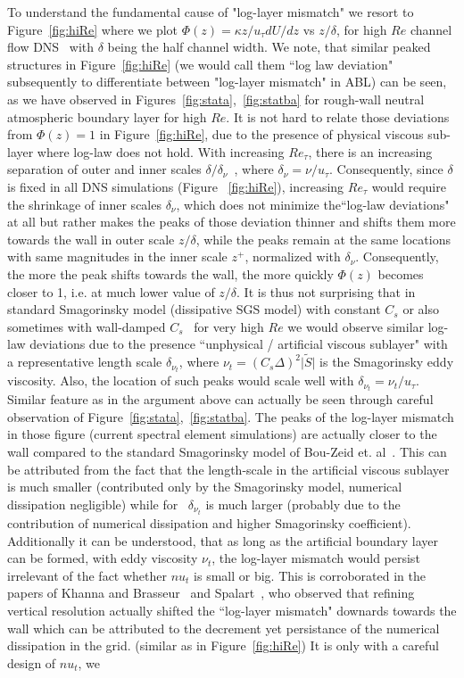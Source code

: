 To understand the fundamental cause of "log-layer mismatch" we resort to Figure~\ref{fig:hiRe} where we plot $\Phi(z) = \kappa z/u_{\tau} dU/dz$ vs $z/\delta$, for high $Re$ channel flow DNS~\cite{lee2} with $\delta$ being the half channel width. We note, that  similar peaked structures in Figure~\ref{fig:hiRe} (we would call them ``log law deviation" subsequently to differentiate between "log-layer mismatch" in ABL) can be seen, as we have  observed in Figures~\ref{fig:stata},~\ref{fig:statba} for rough-wall neutral atmospheric boundary layer for high $Re$. It is not hard to relate those deviations from $\Phi(z) = 1$ in Figure~\ref{fig:hiRe}, due to the presence of physical viscous sub-layer where log-law does not hold. With increasing $Re_{\tau}$, there is an increasing separation of outer and inner scales $\delta/\delta_{\nu}$~\cite{pope,balad}, where $\delta_{\nu} = \nu/u_{\tau}$. Consequently, since $\delta$ is fixed in all DNS simulations (Figure ~\ref{fig:hiRe}), increasing $Re_{\tau}$ would require the shrinkage of inner scales $\delta_{\nu}$, which does not minimize the``log-law deviations" at all but rather makes the peaks of those deviation thinner and  shifts them more towards the wall in outer scale $z/\delta$, while the peaks remain at the same locations with same magnitudes in the inner scale $z^{+}$, normalized with $\delta_{\nu}$. Consequently, the more the peak shifts towards the wall, the more quickly $\Phi(z)$ becomes closer to 1, i.e. at much lower value of $z/\delta$.  It is thus not surprising that in standard Smagorinsky model (dissipative SGS model) with constant $C_s$ or also sometimes with wall-damped $C_s$~\cite{mason,chow} for very high $Re$ we would observe similar log-law deviations due to the presence ``unphysical / artificial viscous sublayer" with a representative length scale $\delta_{\nu_t}$, where $\nu_{t} = (C_s\Delta)^{2}\vert \widetilde{S} \vert$ is the Smagorinsky eddy viscosity. Also, the location of such peaks would scale well with $\delta_{\nu_{t}} = \nu_{t}/u_{\tau}$. Similar feature as in the argument above can actually be seen through careful observation of Figure~\ref{fig:stata},~\ref{fig:statba}. The peaks of the log-layer mismatch in those figure (current spectral element simulations) are actually closer to the wall compared to the standard Smagorinsky model of Bou-Zeid et. al~\cite{bou1}. This can be attributed from the fact that the length-scale in the artificial viscous sublayer is much smaller (contributed only by the Smagorinsky model, numerical dissipation negligible) while for~\cite{bou1} $\delta_{\nu_t}$ is much larger (probably due to the contribution of numerical dissipation and higher Smagorinsky coefficient). Additionally it can be understood, that as long as the artificial boundary layer can be formed, with eddy viscosity $\nu_t$, the log-layer mismatch would persist irrelevant of the fact whether $nu_{t}$ is small or big. This is corroborated in the papers of Khanna and Brasseur~\cite{khan} and Spalart~\cite{spal2}, who observed that refining vertical resolution actually shifted the ``log-layer mismatch" downards towards the wall which can be attributed to the decrement yet persistance of the numerical dissipation in the grid. (similar as in Figure~\ref{fig:hiRe}) It is only with a careful design of $nu_{t}$, we 